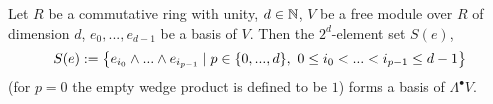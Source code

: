 \begin{proposition}
  Let
    $R$ be a commutative ring with unity,
    $d \in \mathbb{N}$,
    $V$ be a free module over $R$ of dimension $d$,
    $e_0, ..., e_{d - 1}$ be a basis of $V$.
  Then the $2^d$-element set $S(e)$,
  \begin{equation}
    S(e) :=
    \left\{ e_{i_0} \wedge ... \wedge e_{i_{p - 1}} \mid p \in \{0, ..., d\},\ 0 \leq i_0 < ... < i_{p - 1} \leq d - 1 \right\}
  \end{equation}
  (for $p = 0$ the empty wedge product is defined to be $1$)
  forms a basis of $\Lambda^\bullet V$.
\end{proposition}
